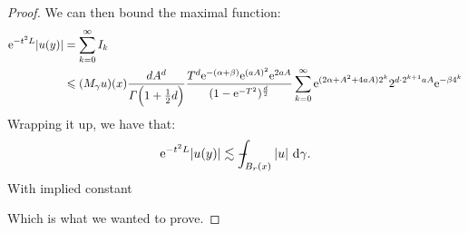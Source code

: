 \documentclass[a4paper,oneside,10pt]{amsproc}
\theoremstyle{plain}
\theoremstyle{remark}
\theoremstyle{definition}
\newcommand{\D}{\,\textup{d}}
\def\Xint#1{\mathchoice
  {\XXint\displaystyle\textstyle{#1}}%
  {\XXint\textstyle\scriptstyle{#1}}%
  {\XXint\scriptstyle\scriptscriptstyle{#1}}%
  {\XXint\scriptscriptstyle\scriptscriptstyle{#1}}%
  \!\int}
\def\XXint#1#2#3{{\setbox0=\hbox{$#1{#2#3}{\int}$ }
    \vcenter{\hbox{$#2#3$ }}\kern-.535\wd0}}
\def\dashint{\Xint-}
\renewcommand{\leq}{\leqslant}
\renewcommand{\leq}{\leqslant}
\newcommand{\e}{\mathrm{e}} %
\renewcommand{\leq}{\leqslant}%
\begin{document}
\begin{proof}
  We can then bound the maximal function:
  \begin{equation}
    \label{eq:Maximal-function-cone-intermediate-step-1}
    \begin{split}
      \e^{-t^2 L} |u(y)| &= \sum_{k = 0}^\infty I_k\\
      &\leq (M_\gamma u)(x) \frac{d A^d}{\Gamma\Bigl(1 + \frac12
        d\Bigr)}  \frac{T^d \e^{-(\alpha + \beta)} \e^{(aA)^2} \e^{2aA}}{(1 - \e^{-T^2})^{\frac{d}2}}
\sum_{k = 0}^\infty \e^{(2\alpha + A^2 + 4aA) 2^k}  2^{d \cdot 2^{k + 1} a A} \e^{-\beta
  4^k} \\
    \end{split}
  \end{equation}
  Wrapping it up, we have that:
  \begin{equation*}
    \e^{-t^2 L} |u(y)| \lesssim \dashint_{B_r(x)} |u| \, \D\gamma.
  \end{equation*}
  With implied constant

  Which is what we wanted to prove.
\end{proof}


\printbibliography
\end{document}
